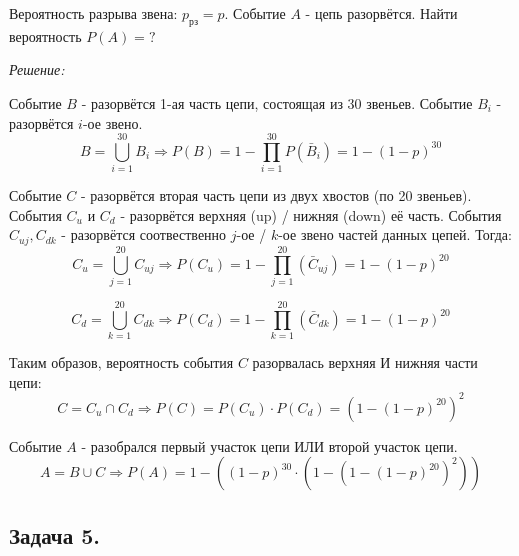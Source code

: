 Вероятность разрыва звена: $p_{\text{рз}} = p$. Событие $A$ - цепь разорвётся. Найти вероятность $P(A) = ?$
\begin{figure}[H]
\end{figure}

\textit{Решение:}

Событие $B$ - разорвётся 1-ая часть цепи, состоящая из 30 звеньев. Событие $B_i$ - разорвётся $i$-ое звено.
\[ B = \bigcup\limits_{i=1}^{30} B_i \Rightarrow P(B) = 1 - \prod_{i=1}^{30}P(\bar B_i) = 1 - (1 - p)^{30} \]

Событие $C$ - разорвётся вторая часть цепи из двух хвостов (по 20 звеньев). События $C_u$ и $C_d$ - разорвётся верхняя (up) / нижняя (down) её часть. События $C_{uj}, C_{dk}$ - разорвётся соотвественно $j$-ое / $k$-ое звено частей данных цепей. Тогда:
\[ C_u = \bigcup\limits_{j=1}^{20} C_{uj} \Rightarrow P(C_u) = 1 - \prod_{j=1}^{20} (\bar C_{uj}) = 1 - (1 - p)^{20} \]

\[ C_d = \bigcup\limits_{k=1}^{20} C_{dk} \Rightarrow P(C_d) = 1 - \prod_{k=1}^{20} (\bar C_{dk}) = 1 - (1 - p)^{20} \]

Таким образов, вероятность события $C$ разорвалась верхняя И нижняя части цепи:
\[ C = C_u \cap C_d \Rightarrow P(C) = P(C_u) \cdot P(C_d) = (1 - (1 - p)^{20})^2 \]

Событие $A$ - разобрался первый участок цепи ИЛИ второй участок цепи.
\[ A = B \cup C \Rightarrow P(A) = 1 - ((1 - p)^{30} \cdot (1 - (1 - (1 - p)^{20})^2)) \]

\subsection*{Задача 5.}

